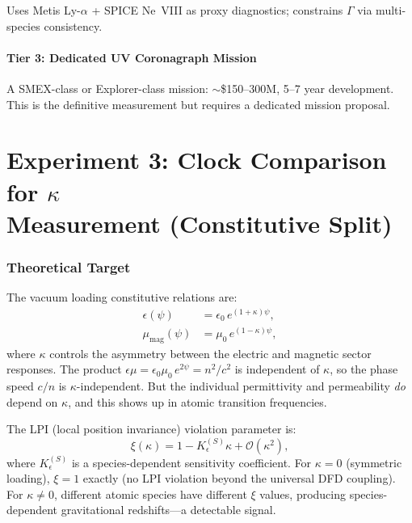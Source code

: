 \documentclass[11pt]{article}
\begin{document}
Uses Metis Ly-$\alpha$ + SPICE Ne~VIII as proxy diagnostics;
constrains $\Gamma$ via multi-species consistency.

\subsection{Tier 3: Dedicated UV Coronagraph Mission}

A SMEX-class or Explorer-class mission:
$\sim$\$150--300M, 5--7 year development.  This is the definitive
measurement but requires a dedicated mission proposal.


\part{Experiment 3: Clock Comparison for $\kappa$\\
Measurement (Constitutive Split)}
\label{part:clocks}


\section{Theoretical Target}
\label{sec:clock-target}

The vacuum loading constitutive relations are:
\begin{align}
\epsilon(\psi) &= \epsilon_0\, e^{(1+\kappa)\psi}, \\
\mu_{\text{mag}}(\psi) &= \mu_0\, e^{(1-\kappa)\psi},
\end{align}
where $\kappa$ controls the asymmetry between the electric and
magnetic sector responses.  The product $\epsilon\mu = \epsilon_0\mu_0\,
e^{2\psi} = n^2/c^2$ is independent of $\kappa$, so the phase
speed $c/n$ is $\kappa$-independent.  But the individual
permittivity and permeability \textit{do} depend on $\kappa$, and
this shows up in atomic transition frequencies.

The LPI (local position invariance) violation parameter is:
\begin{equation}
\xi(\kappa) = 1 - K_\epsilon^{(S)} \kappa + \mathcal{O}(\kappa^2),
\end{equation}
where $K_\epsilon^{(S)}$ is a species-dependent sensitivity
coefficient.  For $\kappa = 0$ (symmetric loading), $\xi = 1$
exactly (no LPI violation beyond the universal DFD coupling).
For $\kappa \neq 0$, different atomic species have different
$\xi$ values, producing species-dependent gravitational
redshifts---a detectable signal.
\end{document}
